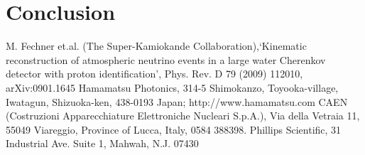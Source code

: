 \documentclass[preprint,12pt]{elsarticle}
\begin{document}
 \section{Conclusion}
 \label{conclusionsection}








 \begin{thebibliography}{00}

 M. Fechner et.al. (The Super-Kamiokande Collaboration),`Kinematic reconstruction of atmospheric neutrino events in a large water Cherenkov detector with proton identification', Phys. Rev. D 79 (2009) 112010, arXiv:0901.1645
 Hamamatsu Photonics, 314-5 Shimokanzo, Toyooka-village, Iwatagun, Shizuoka-ken, 438-0193 Japan; http://www.hamamatsu.com
 CAEN (Costruzioni Apparecchiature Elettroniche Nucleari S.p.A.), Via della Vetraia 11, 55049 Viareggio, Province of Lucca, Italy, 0584 388398.
 Phillips Scientific, 31 Industrial Ave. Suite 1, Mahwah, N.J.  07430



 \end{thebibliography}
\end{document}
